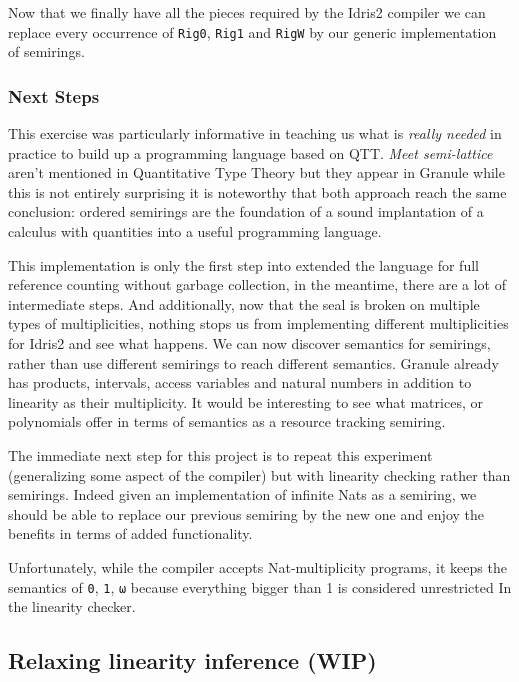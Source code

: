 \documentclass[
]{article}
\begin{document}
Now that we finally have all the pieces required by the Idris2 compiler
we can replace every occurrence of \texttt{Rig0}, \texttt{Rig1} and
\texttt{RigW} by our generic implementation of semirings.

\hypertarget{next-steps}{%
\subsubsection{Next Steps}\label{next-steps}}

This exercise was particularly informative in teaching us what is
\emph{really needed} in practice to build up a programming language
based on QTT. \emph{Meet semi-lattice} aren't mentioned in Quantitative
Type Theory\cite{qtt} but they appear in Granule \cite{granule} while
this is not entirely surprising it is noteworthy that both approach
reach the same conclusion: ordered semirings are the foundation of a
sound implantation of a calculus with quantities into a useful
programming language.

This implementation is only the first step into extended the language
for full reference counting without garbage collection, in the meantime,
there are a lot of intermediate steps. And additionally, now that the
seal is broken on multiple types of multiplicities, nothing stops us
from implementing different multiplicities for Idris2 and see what
happens. We can now discover semantics for semirings, rather than use
different semirings to reach different semantics. Granule already has
products, intervals, access variables and natural numbers in addition to
linearity as their multiplicity. It would be interesting to see what
matrices, or polynomials offer in terms of semantics as a resource
tracking semiring.

The immediate next step for this project is to repeat this experiment
(generalizing some aspect of the compiler) but with linearity checking
rather than semirings. Indeed given an implementation of infinite Nats
as a semiring, we should be able to replace our previous semiring by the
new one and enjoy the benefits in terms of added functionality.

Unfortunately, while the compiler accepts Nat-multiplicity programs, it
keeps the semantics of \texttt{0}, \texttt{1}, \texttt{ω} because
everything bigger than 1 is considered unrestricted In the linearity
checker.

\hypertarget{relaxing-linearity-inference-wip}{%
\subsection{Relaxing linearity inference
(WIP)}\label{relaxing-linearity-inference-wip}}
\end{document}
